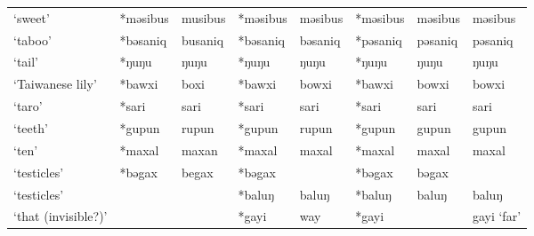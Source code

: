 \begin{landscape}
\begin{longtable}[c]{@{}p{3cm}<{\raggedright}p{2.75cm}<{\raggedright}p{2.75cm}<{\raggedright}p{2.75cm}<{\raggedright}p{2.75cm}<{\raggedright}p{2.75cm}<{\raggedright}p{2.75cm}<{\raggedright}p{2.75cm}<{\raggedright}@{}}
`sweet'                                              & *məsibus     & musibus                       & *məsibus       & məsibus                    & *məsibus         & məsibus                  & məsibus                           \\
`taboo'                                              & *bəsaniq     & busaniq                       & *bəsaniq       & bəsaniq                    & *pəsaniq         & pəsaniq                  & pəsaniq                           \\
`tail'                                               & *ŋuŋu        & ŋuŋu                          & *ŋuŋu          & ŋuŋu                       & *ŋuŋu            & ŋuŋu                     & ŋuŋu                              \\
`Taiwanese lily'                                     & *bawxi       & boxi                          & *bawxi         & bowxi                      & *bawxi           & bowxi                    & bowxi                             \\
`taro'                                               & *sari        & sari                          & *sari          & sari                       & *sari            & sari                     & sari                              \\
`teeth'                                              & *gupun       & rupun                         & *gupun         & rupun                      & *gupun           & gupun                    & gupun                             \\
`ten'                                                & *maxal       & maxan                         & *maxal         & maxal                      & *maxal           & maxal                    & maxal                             \\
`testicles'                                          & *bəgax       & begax                         & *bəgax         &                            & *bəgax           & bəgax                    &                                   \\
`testicles'                                          &              &                               & *baluŋ         & baluŋ                      & *baluŋ           & baluŋ                    & baluŋ                             \\
`that (invisible?)'                                  &              &                               & *gayi          & way                        & *gayi            &                          & gayi `far'                        \\

\end{longtable}
\end{landscape}
